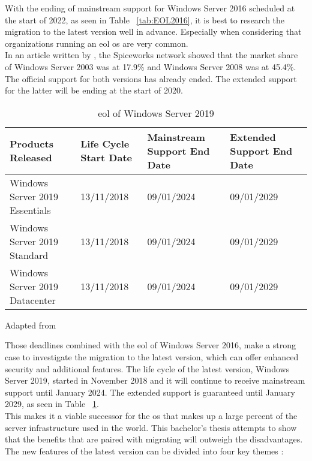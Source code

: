 With the ending of mainstream support for Windows Server 2016 scheduled at the start of 2022, as seen in Table ~\ref{tab:EOL2016}, it is best to research the migration to the latest version well in advance. 
Especially when considering that organizations running an \acrfull{eol} \acrshort{os} are very common. \\
In an article written by \textcite{Tsai2016}, the Spiceworks network showed that the market share of Windows Server 2003 was at 17.9\% and Windows Server 2008 was at 45.4\%. 
The official support for both versions has already ended. The extended support for the latter will be ending at the start of 2020. 

\begin{table}[ht]
	\centering
	\begin{adjustbox}{width=1\textwidth}
		\begin{tabular}{l|l|l|ll}
			Products Released & Life Cycle Start Date & Mainstream Support End Date & Extended Support End Date &\\
			\hline
			Windows Server 2019 Essentials & 13/11/2018 & 09/01/2024 & 09/01/2029 &\\
			Windows Server 2019 Standard & 13/11/2018 & 09/01/2024 & 09/01/2029 &\\
			Windows Server 2019 Datacenter & 13/11/2018 & 09/01/2024 & 09/01/2029 &\\
		\end{tabular}
	\end{adjustbox}
	\caption[\acrshort{eol} \acrshort{ws}2019]{\acrshort{eol} of Windows Server 2019}
	\scriptsize	
	Adapted from \cite{MicrosoftEOL2019}
	\label{tab:EOL2019}
\end{table}

Those deadlines combined with the \acrshort{eol} of Windows Server 2016, make a strong case to investigate the migration to the latest version, which can offer enhanced security and additional features. 
The life cycle of the latest version, Windows Server 2019, started in November 2018 and it will continue to receive mainstream support until January 2024. 
The extended support is guaranteed until January 2029, as seen in Table ~\ref{tab:EOL2019}.\\
This makes it a viable successor for the \acrshort{os} that makes up a large percent of the server infrastructure used in the world. 
This bachelor's thesis attempts to show that the benefits that are paired with migrating will outweigh the disadvantages. 
The new features of the latest version can be divided into four key themes \autocite{MWST2018}:

